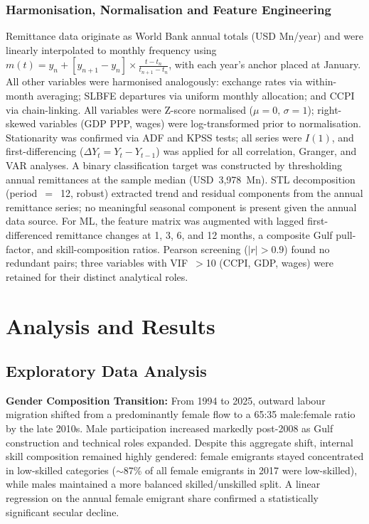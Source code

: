 \documentclass[sigconf]{acmart}
\begin{document}
\subsubsection{Harmonisation, Normalisation and Feature Engineering}
Remittance data originate as World Bank annual totals (USD Mn/year) and were linearly interpolated to monthly frequency using $m(t) = y_n + [y_{n+1}-y_n]\times\frac{t-t_n}{t_{n+1}-t_n}$, with each year's anchor placed at January. All other variables were harmonised analogously: exchange rates via within-month averaging; SLBFE departures via uniform monthly allocation; and CCPI via chain-linking. All variables were Z-score normalised ($\mu=0,\,\sigma=1$); right-skewed variables (GDP PPP, wages) were log-transformed prior to normalisation. Stationarity was confirmed via ADF and KPSS tests; all series were $I(1)$, and first-differencing ($\Delta Y_t=Y_t-Y_{t-1}$) was applied for all correlation, Granger, and VAR analyses. A binary classification target was constructed by thresholding annual remittances at the sample median (USD~3,978~Mn). STL decomposition (period~$=$~12, robust) extracted trend and residual components from the annual remittance series; no meaningful seasonal component is present given the annual data source. For ML, the feature matrix was augmented with lagged first-differenced remittance changes at 1, 3, 6, and 12 months, a composite Gulf pull-factor, and skill-composition ratios. Pearson screening ($|r|>0.9$) found no redundant pairs; three variables with VIF~$>$10 (CCPI, GDP, wages) were retained for their distinct analytical roles.

\section{Analysis and Results}

\subsection{Exploratory Data Analysis}

\noindent\textbf{Gender Composition Transition:}
From 1994 to 2025, outward labour migration shifted from a predominantly female flow to a 65:35 male:female ratio by the late 2010s. Male participation increased markedly post-2008 as Gulf construction and technical roles expanded. Despite this aggregate shift, internal skill composition remained highly gendered: female emigrants stayed concentrated in low-skilled categories ($\sim$87\% of all female emigrants in 2017 were low-skilled), while males maintained a more balanced skilled/unskilled split. A linear regression on the annual female emigrant share confirmed a statistically significant secular decline.
\end{document}
